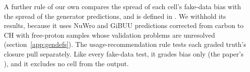 A further rule of our own compares the spread of each cell's fake-data bias with the spread of the generator predictions, and is defined in . We withhold its results, because it uses NuWro and GiBUU predictions corrected from carbon to CH with free-proton samples whose validation problems are unresolved (section~\ref{app:gendefs}). The usage-recommendation rule tests each graded truth's closure pull separately. Like every fake-data test, it grades bias only (the paper's ), and it excludes no cell from the output.

